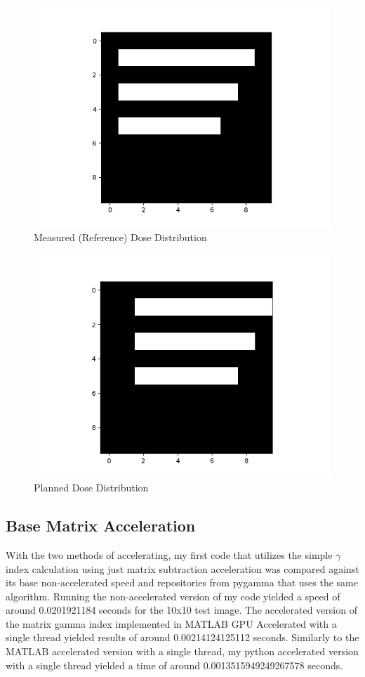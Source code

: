 \documentclass[12pt]{article}
\begin{document}
\begin{figure}[h]
  \centering
  \includegraphics[scale=0.3]{images/reference.png}
  \caption{Measured (Reference) Dose Distribution}
  \label{fig:mat}
\end{figure}

\begin{figure}[h]
  \centering
  \includegraphics[scale=0.3]{images/planned.png}
  \caption{Planned Dose Distribution}
  \label{fig:mat}
\end{figure}

\subsection{Base Matrix Acceleration}
With the two methods of accelerating, my first code that utilizes the simple $\gamma$ index calculation using just matrix subtraction acceleration was compared against its base non-accelerated speed and repositories from pygamma that uses the same algorithm. Running the non-accelerated version of my code yielded a speed of around 0.0201921184 seconds for the 10x10 test image. The accelerated version of the matrix gamma index implemented in MATLAB GPU Accelerated with a single thread yielded results of around 0.00214124125112 seconds. Similarly to the MATLAB accelerated version with a single thread, my python accelerated version with a single thread yielded a time of around 0.0013515949249267578 seconds.
\end{document}

